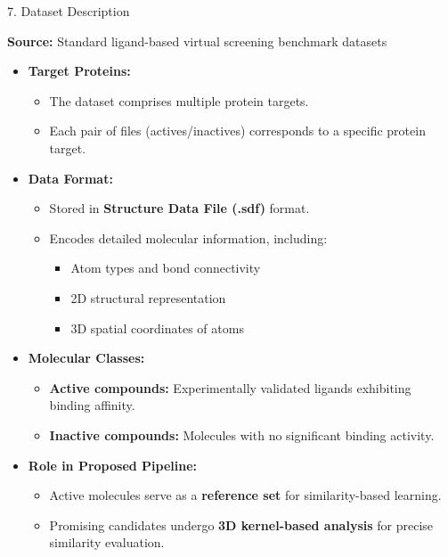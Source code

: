 \documentclass[aspectratio=169, 11pt]{beamer}
\begin{document}
\begin{frame}{7. Dataset Description}

\textbf{Source:} Standard ligand-based virtual screening benchmark datasets

\begin{itemize}
    \item \textbf{Target Proteins:}
    \begin{itemize}
        \item The dataset comprises multiple protein targets.
        \item Each pair of files (actives/inactives) corresponds to a specific protein target.
    \end{itemize}

    \item \textbf{Data Format:}
    \begin{itemize}
        \item Stored in \textbf{Structure Data File (.sdf)} format.
        \item Encodes detailed molecular information, including:
        \begin{itemize}
            \item Atom types and bond connectivity
            \item 2D structural representation
            \item 3D spatial coordinates of atoms
        \end{itemize}
    \end{itemize}

    \item \textbf{Molecular Classes:}
    \begin{itemize}
        \item \textbf{Active compounds:} Experimentally validated ligands exhibiting binding affinity.
        \item \textbf{Inactive compounds:} Molecules with no significant binding activity.
    \end{itemize}

    \item \textbf{Role in Proposed Pipeline:}
    \begin{itemize}
        \item Active molecules serve as a \textbf{reference set} for similarity-based learning.
        \item Promising candidates undergo \textbf{3D kernel-based analysis} for precise similarity evaluation.
    \end{itemize}
\end{itemize}

\end{frame}
\end{document}

